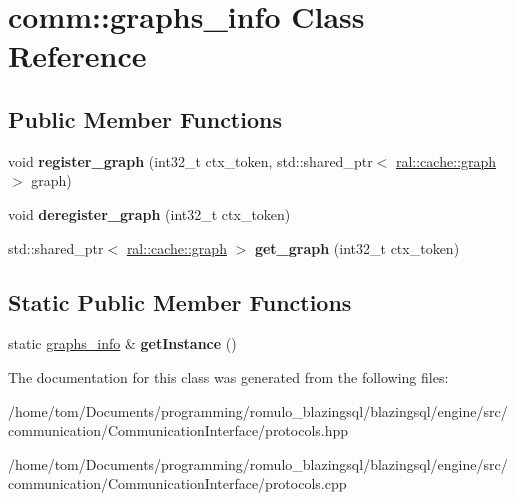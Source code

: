 \hypertarget{classcomm_1_1graphs__info}{}\section{comm\+:\+:graphs\+\_\+info Class Reference}
\label{classcomm_1_1graphs__info}
\subsection*{Public Member Functions}
\begin{DoxyCompactItemize}
\item 
\mbox{\label{classcomm_1_1graphs__info_af257399e8dbe131eccf0394b4cafdcfd}} 
void {\bfseries register\+\_\+graph} (int32\+\_\+t ctx\+\_\+token, std\+::shared\+\_\+ptr$<$ \hyperlink{classral_1_1cache_1_1graph}{ral\+::cache\+::graph} $>$ graph)
\item 
\mbox{\label{classcomm_1_1graphs__info_a7cd098b020586c073d21cedd50f70844}} 
void {\bfseries deregister\+\_\+graph} (int32\+\_\+t ctx\+\_\+token)
\item 
\mbox{\label{classcomm_1_1graphs__info_ae785c84b1aaf6d4ba425f40166fd6122}} 
std\+::shared\+\_\+ptr$<$ \hyperlink{classral_1_1cache_1_1graph}{ral\+::cache\+::graph} $>$ {\bfseries get\+\_\+graph} (int32\+\_\+t ctx\+\_\+token)
\end{DoxyCompactItemize}
\subsection*{Static Public Member Functions}
\begin{DoxyCompactItemize}
\item 
\mbox{\label{classcomm_1_1graphs__info_a4fab1012e68fe7b44013d7aaf387def0}} 
static \hyperlink{classcomm_1_1graphs__info}{graphs\+\_\+info} \& {\bfseries get\+Instance} ()
\end{DoxyCompactItemize}


The documentation for this class was generated from the following files\+:\begin{DoxyCompactItemize}
\item 
/home/tom/\+Documents/programming/romulo\+\_\+blazingsql/blazingsql/engine/src/communication/\+Communication\+Interface/protocols.\+hpp\item 
/home/tom/\+Documents/programming/romulo\+\_\+blazingsql/blazingsql/engine/src/communication/\+Communication\+Interface/protocols.\+cpp\end{DoxyCompactItemize}
